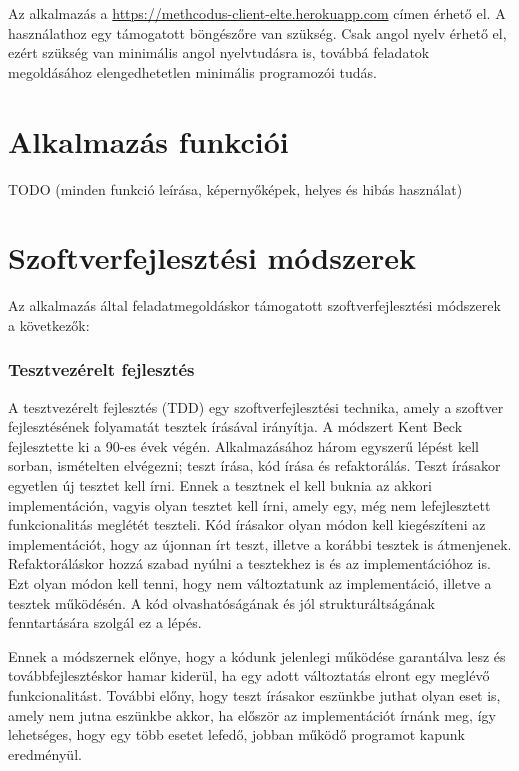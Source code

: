 \documentclass{elteikthesis}
\begin{document}
			Az alkalmazás a \url{https://methcodus-client-elte.herokuapp.com} címen érhető el. A használathoz egy támogatott böngészőre van szükség. Csak angol nyelv érhető el, ezért szükség van minimális angol nyelvtudásra is, továbbá feladatok megoldásához elengedhetetlen minimális programozói tudás.
		
		\section{Alkalmazás funkciói}
		TODO (minden funkció leírása, képernyőképek, helyes és hibás használat)
		
		\section{Szoftverfejlesztési módszerek}
		Az alkalmazás által feladatmegoldáskor támogatott szoftverfejlesztési módszerek a következők:
		\subsubsection{Tesztvezérelt fejlesztés}
			A tesztvezérelt fejlesztés (TDD) \cite{tdd} egy szoftverfejlesztési technika, amely a szoftver fejlesztésének folyamatát tesztek írásával irányítja. A módszert Kent Beck fejlesztette ki a 90-es évek végén. Alkalmazásához három egyszerű lépést kell sorban, ismételten elvégezni; teszt írása, kód írása és refaktorálás. Teszt írásakor egyetlen új tesztet kell írni. Ennek a tesztnek el kell buknia az akkori implementáción, vagyis olyan tesztet kell írni, amely egy, még nem lefejlesztett funkcionalitás meglétét teszteli. Kód írásakor olyan módon kell kiegészíteni az implementációt, hogy az újonnan írt teszt, illetve a korábbi tesztek is átmenjenek. Refaktoráláskor hozzá szabad nyúlni a tesztekhez is és az implementációhoz is. Ezt olyan módon kell tenni, hogy nem változtatunk az implementáció, illetve a tesztek működésén. A kód olvashatóságának és jól strukturáltságának fenntartására szolgál ez a lépés.
			
			Ennek a módszernek előnye, hogy a kódunk jelenlegi működése garantálva lesz és továbbfejlesztéskor hamar kiderül, ha egy adott változtatás elront egy meglévő funkcionalitást. További előny, hogy teszt írásakor eszünkbe juthat olyan eset is, amely nem jutna eszünkbe akkor, ha először az implementációt írnánk meg, így lehetséges, hogy egy több esetet lefedő, jobban működő programot kapunk eredményül.
\end{document}
